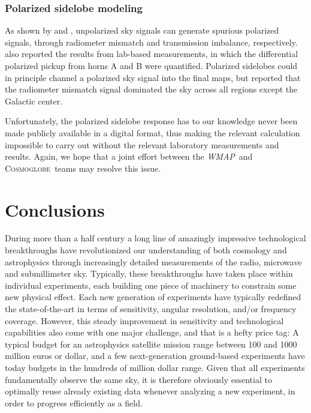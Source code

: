 \documentclass[twocolumn]{../../common/aa}
\def\WMAP{\emph{WMAP}}
\newcommand{\cosmoglobe}{\textsc{Cosmoglobe}}
\begin{document}
\subsubsection{Polarized sidelobe modeling}

As shown by \citet{barnes2003} and \citet{bp17}, unpolarized sky signals can generate spurious polarized signals, through radiometer mismatch and transmission imbalance, respectively. \citet{barnes2003} also reported the results from lab-based measurements, in which the differential polarized pickup from horns A and B were quantified. Polarized sidelobes could in principle channel a polarized sky signal into the final maps, but \citet{barnes2003} reported that the radiometer mismatch signal dominated the sky across all regions except the Galactic center.

Unfortunately, the polarized sidelobe response has to our knowledge never been made publicly available in a digital format, thus making the relevant calculation impossible to carry out without the relevant laboratory measurements and results. Again, we hope that a joint effort between the \WMAP\ and \cosmoglobe\ teams may resolve this issue. 



\section{Conclusions}
\label{sec:conclusions}

During more than a half century a long line of amazingly impressive technological breakthroughs have revolutionized our understanding of both cosmology and astrophysics through increasingly detailed measurements of the radio, microwave and submillimeter sky. Typically, these breakthroughs have taken place within individual experiments, each building one piece of machinery to constrain some new physical effect. Each new generation of experiments have typically redefined the state-of-the-art in terms of sensitivity, angular resolution, and/or frequency coverage. However, this steady improvement in sensitivity and technological capabilities also come with one major challenge, and that is a hefty price tag: A typical budget for an astrophysics satellite mission range between 100 and 1000 million euros or dollar, and a few next-generation ground-based experiments have today budgets in the hundreds of million dollar range. Given that all experiments fundamentally observe the same sky, it is therefore obviously essential to optimally reuse already existing data whenever analyzing a new experiment, in order to progress efficiently as a field.
\end{document}
